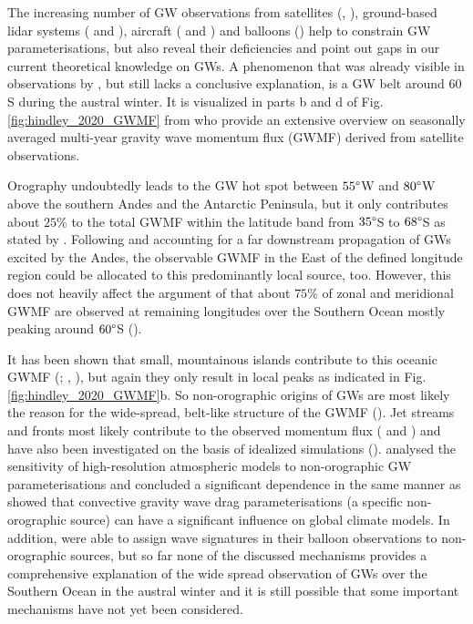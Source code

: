%
The increasing number of GW observations from satellites (\cite{hindley_gravity_2019}, \citeyear{hindley_18year_2020}), ground-based lidar systems (\cite{kaifler_lidar_2020} and  \cite{kaifler_compact_2021}), aircraft (\cite{rapp_southtrac-gw_2021} and \cite{fritts_deep_2016}) and  balloons (\cite{plougonven_gravity_2013}) help to constrain GW parameterisations, but also reveal their deficiencies and point out gaps in our current theoretical knowledge on GWs. A phenomenon that was already visible in observations by \textcite{wu_satellite_1996}, but still lacks a conclusive explanation, is a GW belt around 60 \degree S during the austral winter. It is visualized in parts b and d of Fig. \ref{fig:hindley_2020_GWMF} from \textcite{hindley_18year_2020} who provide an extensive overview on seasonally averaged multi-year gravity wave momentum flux (GWMF) derived from satellite observations.


Orography undoubtedly leads to the GW hot spot between $55 \degree$W and $80 \degree$W above the southern Andes and the Antarctic Peninsula,  but it only contributes about $25 \%$ to the total GWMF within the latitude band from $35 \degree$S to $68 \degree$S as stated by \textcite{hindley_18year_2020}. Following \textcite{sato_gravity_2012} and accounting for a far downstream propagation of GWs excited by the Andes, the observable GWMF in the East of the defined longitude region could be allocated to this predominantly local source, too. However, this does not heavily affect the argument of \textcite{hindley_18year_2020} that about $75 \%$ of zonal and meridional GWMF are observed at remaining longitudes over the Southern Ocean mostly peaking around $60 \degree$S (\cite{hindley_18year_2020}).

It has been shown that small, mountainous islands contribute to this oceanic GWMF (\cite{garfinkel_effect_2018}; \cite{mclandress_is_2012}, \cite{alexander_momentum_2009}), but again they only result in local peaks as indicated in Fig. \ref{fig:hindley_2020_GWMF}b. So non-orographic origins of GWs are most likely the reason for the wide-spread, belt-like structure of the GWMF (\cite{hendricks_what_2014}). Jet streams and fronts most likely contribute to the observed momentum flux (\cite{plougonven_internal_2014} and \cite{hendricks_what_2014}) and have also been investigated on the basis of idealized simulations (\cite{osullivan_generation_1995}). \textcite{polichtchouk_sensitivity_2018} analysed the sensitivity of high-resolution atmospheric models to non-orographic GW parameterisations and concluded a significant dependence in the same manner as \textcite{choi_effects_2013} showed that convective gravity wave drag parameterisations (a specific non-orographic source) can have a significant influence on global climate models. In addition, \textcite{jewtoukoff_comparison_2015} were able to assign wave signatures in their balloon observations to non-orographic sources, but so far none of the discussed mechanisms provides a comprehensive explanation of the wide spread observation of GWs over the Southern Ocean in the austral winter and it is still possible that some important mechanisms have not yet been considered.

